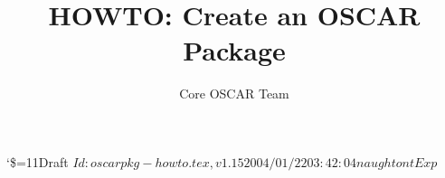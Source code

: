 \documentclass[letterpaper]{article}
\title{HOWTO: Create an OSCAR Package}
\author{Core OSCAR Team}
\begin{document}
\maketitle

\begin{center}
  {\catcode`\$=11\tiny\noindent Draft $Id: oscarpkg-howto.tex,v 1.15 2004/01/22 03:42:04 naughtont Exp $}
\end{center}

\tableofcontents
\listoftables

\newpage



















%
%


%
%
\newpage   %
\appendix


\end{document}

